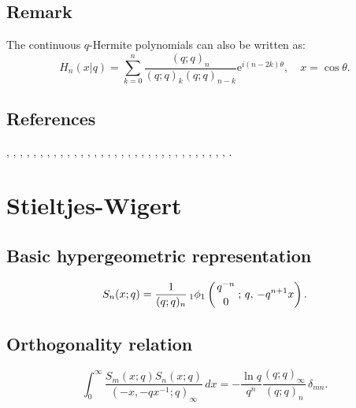 \documentclass[envcountchap,graybox]{svmono}
\newcommand{\qhyp}[5]{\mbox{}_{#1}{\phi}_{#2}
\left(\genfrac{}{}{0pt}{}{#3}{#4}\,;\,q,\,#5\right)}
\newcommand{\e}{\textrm{e}}
\newcommand{\qhyp}[5]{\,\mbox{}_{#1}\phi_{#2}\!\left(
  \genfrac{}{}{0pt}{}{#3}{#4};#5\right)}
\begin{document}
{{\subsection*{Remark} The continuous $q$-Hermite polynomials can also be written
as:
$$H_n(x|q)=\sum_{k=0}^n\frac{(q;q)_n}{(q;q)_k(q;q)_{n-k}}\e^{i(n-2k)\theta},
\quad x=\cos\theta.$$

\subsection*{References}
\cite{Allaway80}, \cite{AlSalam90}, \cite{AlSalam95}, \cite{AlSalamIsmail88},
\cite{AndrewsAskey85}, \cite{Askey89I}, \cite{Askey89II}, \cite{AskeyIsmail80},
\cite{AskeyIsmail83}, \cite{AskeyWilson85}, \cite{AskeyRahmanSuslov}, \cite{AtakKlimyk2007},
\cite{Atak96}, \cite{AtakFeinsilver}, \cite{AtakRahmanSuslov}, \cite{AtakAtakIII},
\cite{AtakAtakIV}, \cite{BergIsmail}, \cite{Bressoud80}, \cite{BustozIsmail82},
\cite{BustozIsmail97}, \cite{FloreaniniVinetI}, \cite{GasperRahman83II}, \cite{GasperRahman90},
\cite{Ismail86II}, \cite{Ismail2005I}, \cite{IsmailMasson94}, \cite{IsmailStanton88},
\cite{IsmailStantonViennot}, \cite{Nikiforov+}, \cite{Rogers93}, \cite{Rogers94},
\cite{Rogers95}, \cite{SrivastavaJain89}.


\section{Stieltjes-Wigert}
\par\setcounter{equation}{0}

\subsection*{Basic hypergeometric representation}
\begin{equation}
\label{DefStieltjesWigert}
S_n(x;q)=\frac{1}{(q;q)_n}\,\qhyp{1}{1}{q^{-n}}{0}{-q^{n+1}x}.
\end{equation}

\subsection*{Orthogonality relation}
\begin{equation}
\label{OrtStieltjesWigert}
\int_{0}^{\infty}\frac{S_m(x;q)S_n(x;q)}{(-x,-qx^{-1};q)_{\infty}}\,dx
=-\frac{\ln q}{q^n}\frac{(q;q)_{\infty}}{(q;q)_n}\,\delta_{mn}.
\end{equation}

}}
\end{document}
